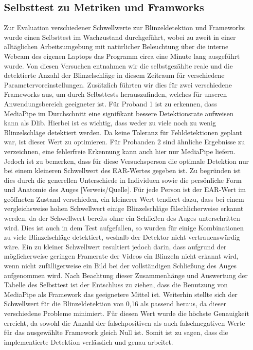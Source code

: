 \subsection{Selbsttest zu Metriken und Framworks}
\label{subsec:selftest}
Zur Evaluation verschiedener Schwellwerte zur Blinzeldetektion und Frameworks wurde einen Selbsttest im Wachzustand durchgeführt, wobei zu zweit in einer alltäglichen Arbeitsumgebung mit natürlicher Beleuchtung über die interne Webcam des eigenen Laptops das Programm circa eine Minute lang ausgeführt wurde. Von diesen Versuchen entnahmen wir die selbstgezählte reale und die detektierte Anzahl der Blinzelschläge in diesem Zeitraum für verschiedene Parametervoreinstellungen. Zusätzlich führten wir dies für zwei verschiedene Frameworks aus, um durch Selbsttests herauszufinden, welches für unseren Anwendungsbereich geeigneter ist. Für Proband 1 ist zu erkennen, dass MediaPipe im Durchschnitt eine signifikant bessere Detektionsrate aufweisen kann als Dlib. Hierbei ist es wichtig, dass weder zu viele noch zu wenig Blinzelschläge detektiert werden. Da keine Toleranz für Fehldetektionen geplant war, ist dieser Wert zu optimieren. Für Probanden 2 sind ähnliche Ergebnisse zu verzeichnen, eine fehlerfreie Erkennung kann auch hier nur MediaPipe liefern. Jedoch ist zu bemerken, dass für diese Versuchsperson die optimale Detektion nur bei einem kleineren Schwellwert des EAR-Wertes gegeben ist. Zu begründen ist dies durch die generellen Unterschiede in Individuen sowie die persönliche Form und Anatomie des Auges [Verweis/Quelle]. Für jede Person ist der EAR-Wert im geöffneten Zustand verschieden, ein kleinerer Wert tendiert dazu, dass bei einem vergleichsweise hohen Schwellwert einige Blinzelschläge fälschlicherweise erkannt werden, da der Schwellwert bereits ohne ein Schließen des Auges unterschritten wird. Dies ist auch in dem Test aufgefallen, so wurden für einige Kombinationen zu viele Blinzelschläge detektiert, weshalb der Detektor nicht vertrauenswürdig wäre. Ein zu kleiner Schwellwert resultiert jedoch darin, dass aufgrund der möglicherweise geringen Framerate der Videos ein Blinzeln nicht erkannt wird, wenn nicht zufälligerweise ein Bild bei der vollständigen Schließung des Auges aufgenommen wird. Nach Beachtung dieser Zusammenhänge und Auswertung der Tabelle des Selbsttest ist der Entschluss zu ziehen, dass die Benutzung von MediaPipe als Framework das geeignetere Mittel ist. Weiterhin stellte sich der Schwellwert für die Blinzeldetektion von 0,16 als passend heraus, da dieser verschiedene Probleme minimiert. Für diesen Wert wurde die höchste Genauigkeit erreicht, da sowohl die Anzahl der falschpositiven als auch falschnegativen Werte für das ausgewählte Framework gleich Null ist. Somit ist zu sagen, dass die implementierte Detektion verlässlich und genau arbeitet. 

